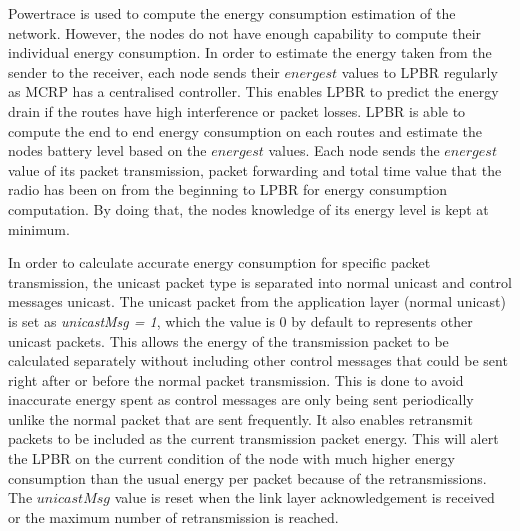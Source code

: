 Powertrace is used to compute the energy consumption estimation of the network. However, the nodes do not have enough capability to compute their individual energy consumption. In order to estimate the energy taken from the sender to the receiver, each node sends their $energest$ values to LPBR regularly as MCRP has a centralised controller. This enables LPBR to predict the energy drain if the routes have high interference or packet losses. LPBR is able to compute the end to end energy consumption on each routes and estimate the nodes battery level based on the $energest$ values. Each node sends the $energest$ value of its packet transmission, packet forwarding and total time value that the radio has been on from the beginning to LPBR for energy consumption computation.
By doing that, the nodes knowledge of its energy level is kept at minimum. 


In order to calculate accurate energy consumption for specific packet transmission, the unicast packet type is separated into normal unicast and control messages unicast. The unicast packet from the application layer (normal unicast) is set as \textit{unicastMsg = 1}, which the value is 0 by default to represents other unicast packets. This allows the energy of the transmission packet to be calculated separately without including other control messages that could be sent right after or before the normal packet transmission. This is done to avoid inaccurate energy spent as control messages are only being sent periodically unlike the normal packet that are sent frequently. It also enables retransmit packets to be included as the current transmission packet energy. This will alert the LPBR on the current condition of the node with much higher energy consumption than the usual energy per packet because of the retransmissions. The $unicastMsg$ value is reset when the link layer acknowledgement is received or the maximum number of retransmission is reached. 


